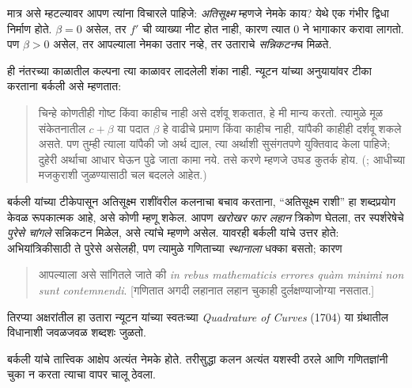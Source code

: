\documentclass[../../../include/open-logic-section]{subfiles}
\begin{document}
मात्र असे म्हटल्यावर आपण त्यांना विचारले पाहिजे: \emph{अतिसूक्ष्म} म्हणजे नेमके काय? येथे एक गंभीर द्विधा निर्माण होते. $\beta = 0$ असेल, तर $f'$ ची व्याख्या नीट होत नाही, कारण त्यात $0$ ने भागाकार करावा लागतो. पण $\beta > 0$ असेल, तर आपल्याला नेमका उतार नव्हे, तर उताराचे \emph{सन्निकटन}च मिळते.

ही नंतरच्या काळातील कल्पना त्या काळावर लादलेली शंका नाही. न्यूटन यांच्या अनुयायांवर टीका करताना बर्कली असे म्हणतात:
\begin{quote}
चिन्हे कोणतीही गोष्ट किंवा काहीच नाही असे दर्शवू शकतात, हे मी मान्य करतो. त्यामुळे मूळ संकेतनातील $c + \beta$ या पदात $\beta$ हे वाढीचे प्रमाण किंवा काहीच नाही, यांपैकी काहीही दर्शवू शकले असते. पण तुम्ही त्याला यांपैकी जो अर्थ द्याल, त्या अर्थाशी सुसंगतपणे युक्तिवाद केला पाहिजे; दुहेरी अर्थाचा आधार घेऊन पुढे जाता कामा नये. तसे करणे म्हणजे उघड कुतर्क होय. (\citealt[\S{}XIII]{Berkeley1734}; आधीच्या मजकुराशी जुळण्यासाठी चल बदलले आहेत.)
\end{quote}
बर्कली यांच्या टीकेपासून अतिसूक्ष्म राशींवरील कलनाचा बचाव करताना, “अतिसूक्ष्म राशी” हा शब्दप्रयोग केवळ रूपकात्मक आहे, असे कोणी म्हणू शकेल. आपण \emph{खरोखर फार लहान} त्रिकोण घेतला, तर स्पर्शरेषेचे \emph{पुरेसे चांगले} सन्निकटन मिळेल, असे त्यांचे म्हणणे असेल. यावरही बर्कली यांचे उत्तर होते: अभियांत्रिकीसाठी ते पुरेसे असेलही, पण त्यामुळे गणिताच्या \emph{स्थानाला} धक्का बसतो; कारण
\begin{quote}
आपल्याला असे सांगितले जाते की \emph{in rebus mathematicis errores qu\`{a}m minimi
non sunt contemnendi}. [गणितात अगदी लहानात लहान चुकाही दुर्लक्षण्याजोग्या नसतात.] \citep[\S{}IX]{Berkeley1734}
\end{quote}
तिरप्या अक्षरांतील हा उतारा न्यूटन यांच्या स्वतःच्या \emph{Quadrature of Curves} (1704) या ग्रंथातील विधानाशी जवळजवळ शब्दशः जुळतो.

बर्कली यांचे तात्त्विक आक्षेप अत्यंत नेमके होते. तरीसुद्धा कलन अत्यंत यशस्वी ठरले आणि गणितज्ञांनी चुका न करता त्याचा वापर चालू ठेवला.
\end{document}
